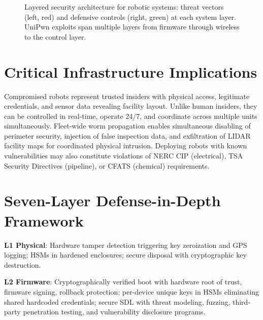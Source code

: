 \documentclass[journal]{IEEEtran}
\begin{document}
\begin{figure}[!t]
\caption{Layered security architecture for robotic systems: threat vectors (left, red)
  and defensive controls (right, green) at each system layer. UniPwn exploits span
  multiple layers from firmware through wireless to the control layer.}
\label{fig:layered_security}
\end{figure}

\section{Critical Infrastructure Implications}

Compromised robots represent trusted insiders with physical access, legitimate credentials,
and sensor data revealing facility layout. Unlike human insiders, they can be controlled
in real-time, operate 24/7, and coordinate across multiple units simultaneously.
Fleet-wide worm propagation enables simultaneous disabling of perimeter security,
injection of false inspection data, and exfiltration of LIDAR facility maps for
coordinated physical intrusion. Deploying robots with known vulnerabilities may also
constitute violations of NERC CIP (electrical), TSA Security Directives (pipeline), or
CFATS (chemical) requirements.

\section{Seven-Layer Defense-in-Depth Framework}

\textbf{L1 Physical}: Hardware tamper detection triggering key zeroization and GPS
logging; HSMs in hardened enclosures; secure disposal with cryptographic key destruction.

\textbf{L2 Firmware}: Cryptographically verified boot with hardware root of trust,
firmware signing, rollback protection; per-device unique keys in HSMs eliminating shared
hardcoded credentials; secure SDL with threat modeling, fuzzing, third-party penetration
testing, and vulnerability disclosure programs.
\end{document}
